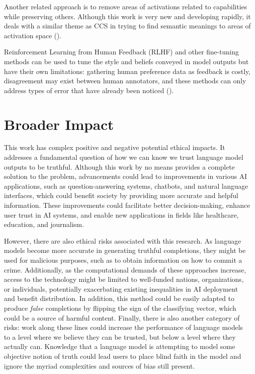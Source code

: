 \documentclass{article}
\begin{document}
Another related approach is to remove areas of activations related to capabilities while preserving others. Although this work is very new and developing rapidly, it deals with a similar theme as CCS in trying to find semantic meanings to areas of activation space (\cite{separation}).
 
Reinforcement Learning from Human Feedback (RLHF) and other fine-tuning methods can be used to tune the style and beliefs conveyed in model outputs but have their own limitations:  gathering human preference data as feedback is costly, disagreement may exist between human annotators, and these methods can only address types of error that have already been noticed (\cite{rlhfsocial}).
 
 \section{Broader Impact}
 
 This work has complex positive and negative potential ethical impacts. It addresses a fundamental question of how we can know we trust language model outputs to be truthful. Although this work by no means provides a complete solution to the problem, advancements could lead to improvements in various AI applications, such as question-answering systems, chatbots, and natural language interfaces, which could benefit society by providing more accurate and helpful information. These improvements could facilitate better decision-making, enhance user trust in AI systems, and enable new applications in fields like healthcare, education, and journalism.
 
However, there are also ethical risks associated with this research. As language models become more accurate in generating truthful completions, they might be used for malicious purposes, such as to obtain information on how to commit a crime. Additionally, as the computational demands of these approaches increase, access to the technology might be limited to well-funded nations, organizations, or individuals, potentially exacerbating existing inequalities in AI deployment and benefit distribution. In addition, this method could be easily adapted to produce {\em false} completions by flipping the sign of the classifying vector, which could be a source of harmful content. Finally, there is also another category of risks: work along these lines could increase the performance of language models to a level where we believe they can be trusted, but below a level where they actually can. Knowledge that a language model is attempting to model some objective notion of truth could lead users to place blind faith in the model and ignore the myriad complexities and sources of bias still present.
\end{document}
